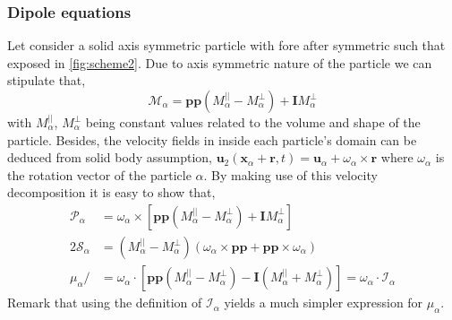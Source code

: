\subsubsection*{Dipole equations}
Let consider a solid axis symmetric particle with fore after symmetric such that exposed in \ref{fig:scheme2}. 
Due to axis symmetric nature of the particle we can stipulate that, 
\begin{equation}
    \mathcal{M}_\alpha =  \textbf{pp} (M_\alpha^{||} - M_\alpha^\bot) 
    +  \textbf{I} M_\alpha^\bot
    \label{eq:M_definition}
\end{equation}
with $M_\alpha^{||}$, $M_\alpha^\bot$ being constant values related to the volume and shape of the particle. 
Besides, the velocity fields in inside each particle's domain can be deduced from solid body assumption, $\textbf{u}_2(\textbf{x}_\alpha + \textbf{r},t) = \textbf{u}_\alpha + \omega_\alpha \times \textbf{r}$ where $\omega_\alpha$ is the rotation vector of the particle $\alpha$.
By making use of this velocity decomposition it is easy to show that,
\begin{align}
    \mathcal{P}_\alpha
    &=  \omega_\alpha \times \left[
        \textbf{pp}(M_\alpha^{||} - M_\alpha^\bot) 
        + \textbf{I} M_\alpha^\bot
    \right]
    \label{eq:P_edfinition}\\
    2\mathcal{S}_\alpha
    &=  (M_\alpha^{||} - M_\alpha^\bot) \left(
        \omega_\alpha \times
        \textbf{pp}
        + \textbf{pp} \times \omega_\alpha
    \right)
    \label{eq:S_definition}\\
    \mu_\alpha / 
    &= \omega_\alpha \cdot \left[
        \textbf{pp} 
    (M_\alpha^{||}  - M_\alpha^{\bot} ) 
    - \textbf{I}(M_\alpha^{||} + M_\alpha^{\bot})
    \right]
    = \omega_\alpha \cdot\mathcal{I}_\alpha
    \label{eq:mu_definition}
\end{align}
Remark that  using the definition of $\mathcal{I}_\alpha$ yields a much simpler expression for $\mu_\alpha$. 


